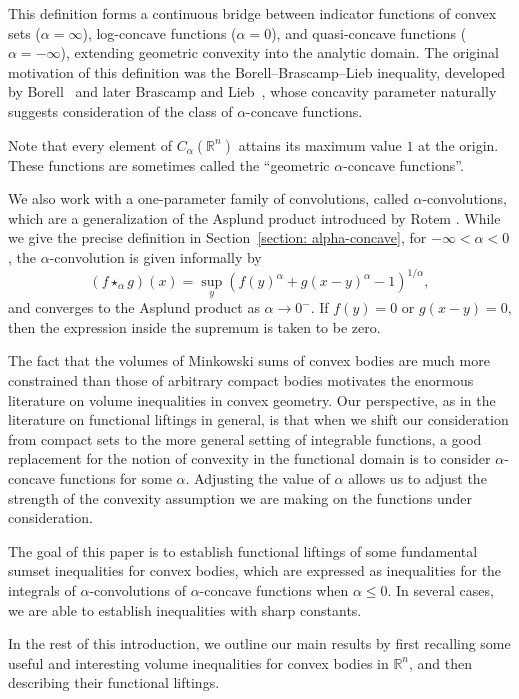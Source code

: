 \documentclass[11pt]{amsart}
\theoremstyle{plain}
\theoremstyle{definition}
\theoremstyle{remark}
\begin{document}
This definition forms a continuous bridge between indicator functions of convex sets ($\alpha = \infty$), log-concave functions ($\alpha= 0$), and quasi-concave functions ($\alpha = -\infty$), extending geometric convexity into the analytic domain. The original motivation of this definition was the Borell--Brascamp--Lieb inequality, developed by Borell~\cite{B-75} and later Brascamp and Lieb~\cite{BL-76}, whose concavity parameter naturally suggests consideration of the class of $\alpha$-concave functions.

Note that every element of $C_\alpha(\mathbb{R}^n)$ attains its maximum value $1$ at the origin. These functions are sometimes called the ``geometric
$\alpha$-concave functions''.

We also work with a one-parameter family of convolutions, called $\alpha$-convolutions, which are a generalization of the Asplund product introduced by Rotem \cite{R-13,MR-13}.
While we give the precise definition in  Section~\ref{section: alpha-concave},
for $-\infty < \alpha <0$, the $\alpha$-convolution is given informally by
\begin{equation}
    (f \star_\alpha g) (x) = \sup_{ y} (f(y)^\alpha + g(x-y)^\alpha -1)^{1/\alpha},
\end{equation}
and converges to the Asplund product as \(\alpha\to0^{-}\).
If $f(y)=0$ or $g(x-y)=0$, then the expression inside the supremum is taken to be zero.

The fact that the volumes of Minkowski sums of convex bodies are much more constrained than those of arbitrary compact bodies motivates the enormous literature on volume inequalities in convex geometry.
Our perspective, as in the literature on functional liftings in general, is that when we shift our consideration from compact sets to the
more general setting of integrable functions,
a good replacement for the notion of convexity in the functional domain is to consider $\alpha$-concave functions for some $\alpha$. Adjusting the value of $\alpha$ allows us to adjust the strength of the convexity assumption we are making on the functions under consideration.

The goal of this paper is to establish functional liftings of some fundamental sumset inequalities for convex bodies, which are expressed as inequalities for the integrals of $\alpha$-convolutions of $\alpha$-concave functions when $\alpha \leq 0$. In several cases, we are able to establish inequalities with sharp constants.

In the rest of this introduction, we outline our main results by first recalling some useful and interesting volume inequalities for convex bodies in  ${\mathbb R}^n$, and then describing their functional liftings.
\end{document}
